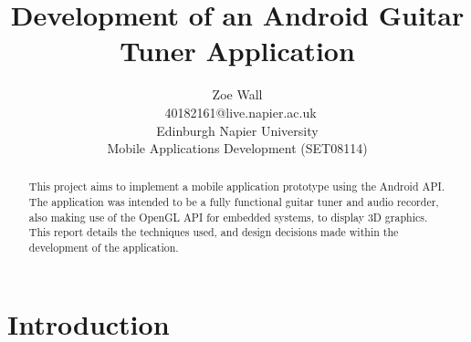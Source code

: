 \documentclass[conference]{acmsiggraph}
\title{Development of an Android Guitar Tuner Application}
\author{Zoe Wall \\\ 40182161@live.napier.ac.uk \\
Edinburgh Napier University \\
Mobile Applications Development (SET08114)}
\newcommand{\figuremacroW}[4]{
	\begin{figure}[H] %
		\centering
		\texttt{[image: \#1]}
		\caption[#2]{\textbf{#2} - #3}
		\label{fig:#1}
	\end{figure}
}
\begin{document}

\maketitle

\begin{abstract} %
This project aims to implement a mobile application prototype using the Android API. The application was intended to be a fully functional guitar tuner and audio recorder, also making use of the OpenGL API for embedded systems, to display 3D graphics. This report details the techniques used, and design decisions made within the development of the application.
\end{abstract}

\keywordlist




\section{Introduction}
\end{document}
